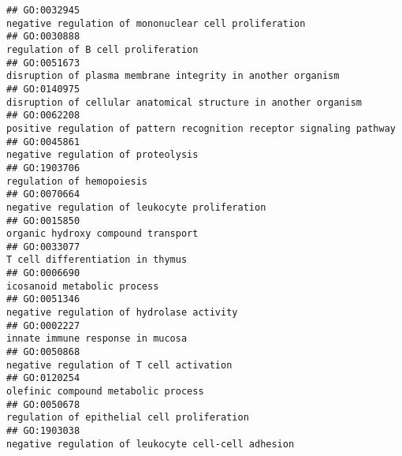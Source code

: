 \documentclass[
]{article}
\begin{document}
\begin{verbatim}
## GO:0032945                                                                                            negative regulation of mononuclear cell proliferation
## GO:0030888                                                                                                               regulation of B cell proliferation
## GO:0051673                                                                                      disruption of plasma membrane integrity in another organism
## GO:0140975                                                                                  disruption of cellular anatomical structure in another organism
## GO:0062208                                                                            positive regulation of pattern recognition receptor signaling pathway
## GO:0045861                                                                                                               negative regulation of proteolysis
## GO:1903706                                                                                                                        regulation of hemopoiesis
## GO:0070664                                                                                                   negative regulation of leukocyte proliferation
## GO:0015850                                                                                                               organic hydroxy compound transport
## GO:0033077                                                                                                                 T cell differentiation in thymus
## GO:0006690                                                                                                                      icosanoid metabolic process
## GO:0051346                                                                                                        negative regulation of hydrolase activity
## GO:0002227                                                                                                                 innate immune response in mucosa
## GO:0050868                                                                                                         negative regulation of T cell activation
## GO:0120254                                                                                                              olefinic compound metabolic process
## GO:0050678                                                                                                      regulation of epithelial cell proliferation
## GO:1903038                                                                                              negative regulation of leukocyte cell-cell adhesion

\end{verbatim}
\end{document}
